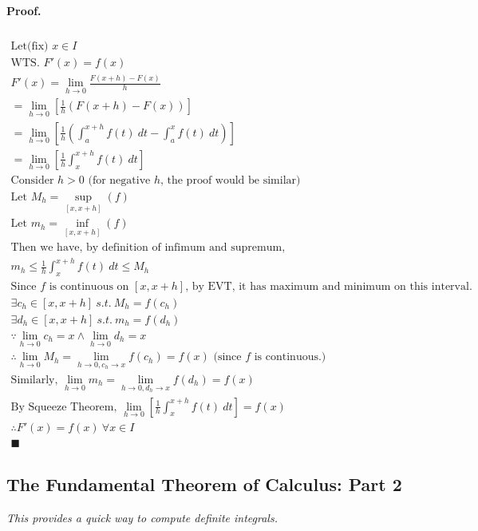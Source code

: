 \documentclass{article}
\begin{document}
	\paragraph{Proof.}
	\begin{multline*}
		\\
		\text{Let(fix) } x \in I \\
		\text{WTS. } F'(x) = f(x) \\
		F'(x) = \lim_{h \to 0}\frac{F(x+h) - F(x)}{h} \\
		= \lim_{h \to 0}[\frac{1}{h}(F(x+h) - F(x))] \\
		= \lim_{h \to 0}[\frac{1}{h} (\int_a^{x+h}{f(t)\ dt} - \int_a^{x}{f(t)\ dt})]\\
		= \lim_{h \to 0}[\frac{1}{h} \int_x^{x+h}{f(t)\ dt}] \\
		\text{Consider } h > 0 \text{ (for negative $h$, the proof would be similar)}\\
		\text{Let }M_h = \sup_{[x,x+h]}(f) \\
		\text{Let }m_h = \inf_{[x,x+h]}(f) \\
		\text{Then we have, by definition of infimum and supremum, }\\
		m_h \leq \frac{1}{h}\int_x^{x+h}{f(t)\ dt} \leq M_h \\
		\text{Since $f$ is continuous on $[x, x+h]$, by EVT, it has maximum and minimum on this interval.} \\
		\exists c_h \in [x, x+h]\ s.t.\ M_h = f(c_h) \\
		\exists d_h \in [x, x+h]\ s.t.\ m_h = f(d_h) \\
		\because \lim_{h \to 0}{c_h} = x \land \lim_{h \to 0}{d_h} = x \\
		\therefore \lim_{h\to0}M_h = \lim_{h\to0,c_h\to x}f(c_h) = f(x) \text{ (since $f$ is continuous.)}\\
		\text{Similarly, } \lim_{h\to0}m_h = \lim_{h\to0,d_h\to x}f(d_h) = f(x) \\
		\text{By Squeeze Theorem, } \lim_{h\to0}[\frac{1}{h}\int_x^{x+h}{f(t)\ dt}] = f(x) \\
		\therefore F'(x) = f(x)\ \forall x \in I \\
		\blacksquare
	\end{multline*}
	
	\subsection{The Fundamental Theorem of Calculus: Part 2}
	\emph{This provides a quick way to compute definite integrals.}
\end{document}
